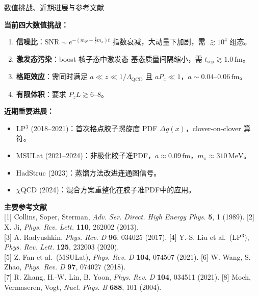 \documentclass[10pt,aspectratio=169]{beamer}
\newcommand{\lqcd}{\Lambda_{\mathrm{QCD}}}
\newcommand{\MeV}{\,\mathrm{MeV}}
\newcommand{\fm}{\,\mathrm{fm}}
\begin{document}
\begin{frame}{数值挑战、近期进展与参考文献}

  \textbf{当前四大数值挑战：}
  \begin{enumerate}
    \item \textbf{信噪比}：$\mathrm{SNR} \sim e^{-(m_N - \frac{3}{2}m_\pi)t}$ 指数衰减，大动量下加剧，需 $\gtrsim 10^4$ 组态。
    \item \textbf{激发态污染}：boost 核子态中激发态-基态质量间隔缩小，需 $t_{\mathrm{sep}} \gtrsim 1.0\fm$。
    \item \textbf{格距效应}：需同时满足 $a \ll z \ll 1/\lqcd$ 且 $aP_z \ll 1$，$a \sim 0.04$--$0.06\fm$。
    \item \textbf{有限体积}：要求 $P_z L \gtrsim 6$--$8$。
  \end{enumerate}

  \textbf{近期重要进展：}
  \begin{itemize}
    \item LP$^3$ (2018--2021)：首次格点胶子螺旋度 PDF $\Delta g(x)$，clover-on-clover 算符。
    \item MSULat (2021--2024)：非极化胶子准PDF，$a \approx 0.09\fm$，$m_\pi \approx 310\MeV$。
    \item HadStruc (2023)：蒸馏方法改进连通图信号。
    \item $\chi$QCD (2024)：混合方案重整化在胶子准PDF中的应用。
  \end{itemize}

  {\footnotesize
  \textbf{主要参考文献}\\
  \hspace{1em}[1] Collins, Soper, Sterman, \textit{Adv. Ser. Direct. High Energy Phys.} \textbf{5}, 1 (1989).
  \hfill [2] X. Ji, \textit{Phys. Rev. Lett.} \textbf{110}, 262002 (2013).\\
  \hspace{1em}[3] A. Radyushkin, \textit{Phys. Rev. D} \textbf{96}, 034025 (2017).
  \hfill [4] Y.-S. Liu et al.\ (LP$^3$), \textit{Phys. Rev. Lett.} \textbf{125}, 232003 (2020).\\
  \hspace{1em}[5] Z. Fan et al.\ (MSULat), \textit{Phys. Rev. D} \textbf{104}, 074507 (2021).
  \hfill [6] W. Wang, S. Zhao, \textit{Phys. Rev. D} \textbf{97}, 074027 (2018).\\
  \hspace{1em}[7] R. Zhang, H.-W. Lin, B. Yoon, \textit{Phys. Rev. D} \textbf{104}, 034511 (2021).
  \hfill [8] Moch, Vermaseren, Vogt, \textit{Nucl. Phys. B} \textbf{688}, 101 (2004).}
\end{frame}
\end{document}
